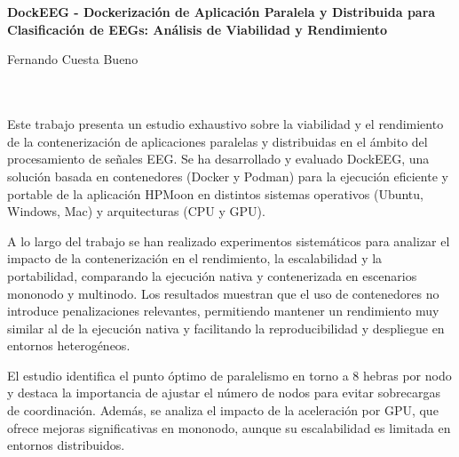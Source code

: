 \chapter*{}






\cleardoublepage
\thispagestyle{empty}

\begin{center}
       {\large\bfseries DockEEG - Dockerización de Aplicación Paralela y Distribuida para Clasificación de EEGs: Análisis de Viabilidad y Rendimiento}\\
\end{center}
\begin{center}
       Fernando Cuesta Bueno\\
\end{center}

\\

\vspace{0.7cm}
\\

Este trabajo presenta un estudio exhaustivo sobre la viabilidad y el rendimiento de la contenerización de aplicaciones paralelas y distribuidas en el ámbito del procesamiento de señales EEG. Se ha desarrollado y evaluado DockEEG, una solución basada en contenedores (Docker y Podman) para la ejecución eficiente y portable de la aplicación HPMoon en distintos sistemas operativos (Ubuntu, Windows, Mac) y arquitecturas (CPU y GPU).

A lo largo del trabajo se han realizado experimentos sistemáticos para analizar el impacto de la contenerización en el rendimiento, la escalabilidad y la portabilidad, comparando la ejecución nativa y contenerizada en escenarios mononodo y multinodo. Los resultados muestran que el uso de contenedores no introduce penalizaciones relevantes, permitiendo mantener un rendimiento muy similar al de la ejecución nativa y facilitando la reproducibilidad y despliegue en entornos heterogéneos.

El estudio identifica el punto óptimo de paralelismo en torno a 8 hebras por nodo y destaca la importancia de ajustar el número de nodos para evitar sobrecargas de coordinación. Además, se analiza el impacto de la aceleración por GPU, que ofrece mejoras significativas en mononodo, aunque su escalabilidad es limitada en entornos distribuidos.

